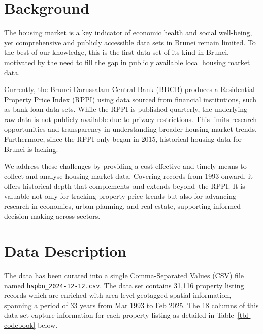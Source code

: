 \documentclass[
  number]{elsarticle}
\begin{document}
\section{Background}\label{background}

The housing market is a key indicator of economic health and social
well-being, yet comprehensive and publicly accessible data sets in
Brunei remain limited. To the best of our knowledge, this is the first
data set of its kind in Brunei, motivated by the need to fill the gap in
publicly available local housing market data.

Currently, the Brunei Darussalam Central Bank (BDCB) produces a
Residential Property Price Index (RPPI) \citep{bdcb2021technical} using
data sourced from financial institutions, such as bank loan data sets.
While the RPPI is published quarterly, the underlying raw data is not
publicly available due to privacy restrictions. This limits research
opportunities and transparency in understanding broader housing market
trends. Furthermore, since the RPPI only began in 2015, historical
housing data for Brunei is lacking.

We address these challenges by providing a cost-effective and timely
means to collect and analyse housing market data. Covering records from
1993 onward, it offers historical depth that complements--and extends
beyond--the RPPI. It is valuable not only for tracking property price
trends but also for advancing research in economics, urban planning, and
real estate, supporting informed decision-making across sectors.

\section{Data Description}\label{data-description}

The data has been curated into a single Comma-Separated Values (CSV)
file named \texttt{hspbn\_2024-12-12.csv}. The data set contains 31,116
property listing records which are enriched with area-level geotagged
spatial information, spanning a period of 33 years from Mar 1993 to Feb
2025. The 18 columns of this data set capture information for each
property listing as detailed in Table~\ref{tbl-codebook} below.
\end{document}
